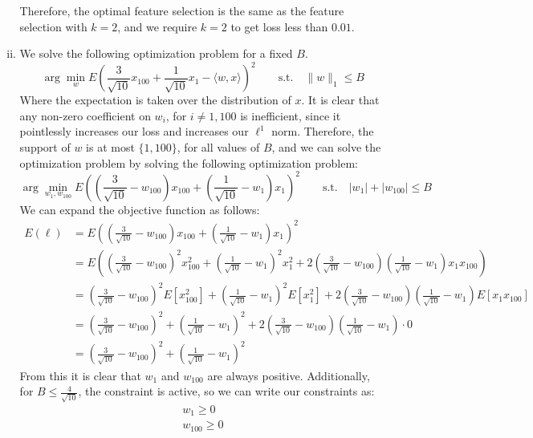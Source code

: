 \documentclass{amsart}
\theoremstyle{definition}
\begin{document}
\begin{enumerate}[(a)]
\begin{enumerate}[i.]
        Therefore, the optimal feature selection is the same as the feature selection with $k=2$, and we require $k = 2$ to get loss less than $0.01$.
      \item
        We solve the following optimization problem for a fixed $B$. 
        \[\arg\min_{w} E\left(\frac{3}{\sqrt{10}} x_{100} + \frac{1}{\sqrt{10}} x_1 - \langle w, x \rangle \right)^2 \qquad \mathrm{s.t.} \quad \|w\|_1 \le B\]
        Where the expectation is taken over the distribution of $x$. It is clear that any non-zero coefficient on $w_i$, for $i \neq 1, 100$ is inefficient, since it pointlessly increases our loss and increases our $\ell^1$ norm. 
        Therefore, the support of $w$ is at most $\{1, 100\}$, for all values of $B$, and we can solve the optimization problem by solving the following optimization problem:
        \[\arg\min_{w_1, w_{100}} E\left(\left(\frac{3}{\sqrt{10}} - w_{100}\right) x_{100} + \left(\frac{1}{\sqrt{10}} - w_1\right) x_1\right)^2 \qquad \mathrm{s.t. } \quad |w_1| + |w_{100}| \le B\]
        We can expand the objective function as follows:
        \begin{align*}
          E(\ell) &= E\left(\left(\frac{3}{\sqrt{10}} - w_{100}\right) x_{100} + \left(\frac{1}{\sqrt{10}} - w_1\right) x_1\right)^2\\
          &= E\left(\left(\frac{3}{\sqrt{10}} -w_{100}\right)^2 x_{100}^2 + \left(\frac{1}{\sqrt{10}} - w_1\right)^2 x_1^2 + 2\left(\frac{3}{\sqrt{10}} - w_{100}\right)\left(\frac{1}{\sqrt{10}} - w_1\right) x_1 x_{100}\right)\\
          &= \left(\frac{3}{\sqrt{10}} - w_{100}\right)^2 E[x_{100}^2] + \left(\frac{1}{\sqrt{10}} - w_1\right)^2 E[x_1^2] + 2\left(\frac{3}{\sqrt{10}} - w_{100}\right)\left(\frac{1}{\sqrt{10}} - w_1\right) E[x_1 x_{100}]\\
          &= \left(\frac{3}{\sqrt{10}} - w_{100}\right)^2 + \left(\frac{1}{\sqrt{10}} - w_1\right)^2 + 2\left(\frac{3}{\sqrt{10}} - w_{100}\right)\left(\frac{1}{\sqrt{10}} - w_1\right) \cdot 0\\
          &= \left(\frac{3}{\sqrt{10}} - w_{100}\right)^2 + \left(\frac{1}{\sqrt{10}} - w_1\right)^2
        \end{align*}
        From this it is clear that $w_1$ and $w_{100}$ are always positive. Additionally, for $B \le \frac{4}{\sqrt{10}}$, the constraint is active, so we can write our constraints as:
        \begin{align*}
          w_1 \ge 0\\
          w_{100} \ge 0\\

\end{align*}
\end{enumerate}
\end{enumerate}
\end{document}
